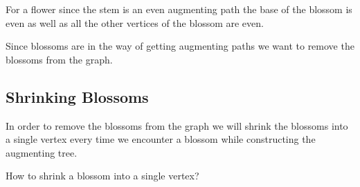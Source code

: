 \begin{observation}
	For a flower since the stem is an even augmenting path the base of the blossom is even as well as all the other vertices of the blossom are even.
\end{observation}

Since blossoms are in the way of getting augmenting paths we want to remove the blossoms from the graph.
\subsection{Shrinking Blossoms}
In order to remove the blossoms from the graph we will shrink the blossoms into a single vertex every time we encounter a blossom while constructing the augmenting tree.
\begin{question}{}{}
	How to shrink a blossom into a single vertex?
\end{question}

